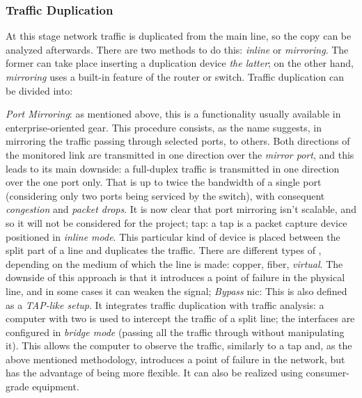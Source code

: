 \subsubsection{Traffic Duplication}
\label{subsubsec:traffic-duplication}

At this stage network traffic is duplicated from the main line, so the copy can be analyzed afterwards. There are two methods to do this: \textit{inline} or \textit{mirroring}. The former can take place inserting a duplication device \textit{the latter}; on the other hand, \textit{mirroring} uses a built-in feature of the router or switch. Traffic duplication can be divided into:
\begin{itemize}
    \itemAR \textit{Port Mirroring}: as mentioned above, this is a functionality usually available in enterprise-oriented gear. This procedure consists, as the name suggests, in mirroring the traffic passing through selected ports, to others. Both directions of the monitored link are transmitted in one direction over the \textit{mirror port}, and this leads to its main downside: a full-duplex traffic is transmitted in one direction over the one port only. That is up to twice the bandwidth of a single port (considering only two ports being serviced by the switch), with consequent \textit{congestion} and \textit{packet drops}. It is now clear that port mirroring isn't scalable, and so it will not be considered for the project;
    \itemAR \gls{tap}: a \gls{tap} is a packet capture device positioned in \textit{inline mode}. This particular kind of device is placed between the split part of a line and duplicates the traffic. There are different types of , depending on the medium of which the line is made: copper, fiber, \textit{virtual}. The downside of this approach is that it introduces a point of failure in the physical line, and in some cases it can weaken the signal;
    \itemAR \textit{Bypass} \gls{nic}: This is also defined as a \textit{TAP-like setup}. It integrates traffic duplication with traffic analysis: a computer with two  is used to intercept the traffic of a split line; the interfaces are configured in \textit{bridge mode} (passing all the traffic through without manipulating it). This allows the computer to observe the traffic, similarly to a \gls{tap} and, as the above mentioned methodology, introduces a point of failure in the network, but has the advantage of being more flexible. It can also be realized using consumer-grade equipment.
\end{itemize}

